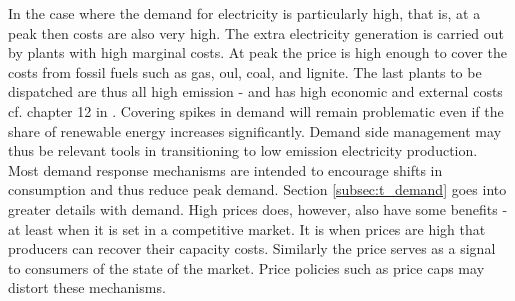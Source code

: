 In the case where the demand for electricity is particularly high, that is, at a peak then costs are also very high. The extra electricity generation is carried out by plants with high marginal costs. At peak the price is high enough to cover the costs from fossil fuels such as gas, oul, coal, and lignite. The last plants to be dispatched are thus all high emission - and has high economic and external costs cf. chapter 12 in \citet{zweifel2017energy}. Covering spikes in demand will remain problematic even if the share of renewable energy increases significantly. Demand side management may thus be relevant tools in transitioning to low emission electricity production. Most demand response mechanisms are intended to encourage shifts in consumption and thus reduce peak demand. Section \ref{subsec:t_demand} goes into greater details with demand. High prices does, however, also have some benefits - at least when it is set in a competitive market. It is when prices are high that producers can recover their capacity costs. Similarly the price serves as a signal to consumers of the state of the market. Price policies such as price caps may distort these mechanisms.



